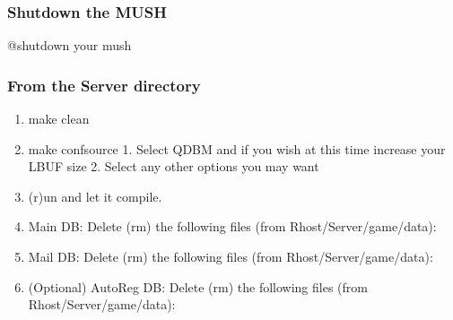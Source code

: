 \documentclass[letterpaper,10pt,english]{sphinxmanual}
\begin{document}
\subsubsection{Shutdown the MUSH}
\label{\detokenize{legacy:shutdown-the-mush}}
\sphinxAtStartPar
@shutdown your mush


\subsubsection{From the Server directory}
\label{\detokenize{legacy:from-the-server-directory}}\begin{enumerate}
%
\item {} 
\sphinxAtStartPar
make clean

\item {} 
\sphinxAtStartPar
make confsource
1.  Select QDBM and if you wish at this time increase your LBUF size
2.  Select any other options you may want

\item {} 
\sphinxAtStartPar
(r)un and let it compile.

\item {} 
\sphinxAtStartPar
Main DB: Delete (rm) the following files (from Rhost/Server/game/data):

\begin{sphinxVerbatim}[commandchars=\\\{\}]
\end{sphinxVerbatim}

\item {} 
\sphinxAtStartPar
Mail DB: Delete (rm) the following files (from Rhost/Server/game/data):

\begin{sphinxVerbatim}[commandchars=\\\{\}]
\end{sphinxVerbatim}

\item {} 
\sphinxAtStartPar
(Optional) AutoReg DB: Delete (rm) the following files (from Rhost/Server/game/data):


\end{enumerate}
\end{document}
